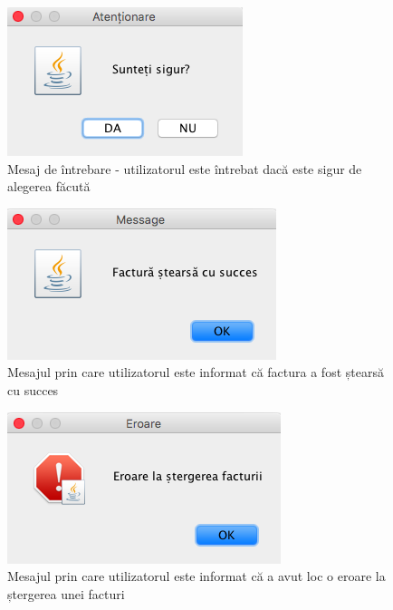 \documentclass[12pt]{book}
\begin{document}
\begin{figure}[!ht]
	\centering
	\includegraphics{SuntetiSigur}
	\caption{Mesaj de întrebare - utilizatorul este întrebat dacă este sigur de alegerea făcută}
\end{figure}

\begin{figure}[!ht]
	\centering
	\includegraphics{FacturaStearsaSucces}
	\caption{Mesajul prin care utilizatorul este informat că factura a fost ștearsă cu succes}
\end{figure}

\begin{figure}[!ht]
	\centering
	\includegraphics{EroareStergereFactura}
	\caption{Mesajul prin care utilizatorul este informat că a avut loc o eroare la ștergerea unei facturi}
\end{figure}
\end{document}
